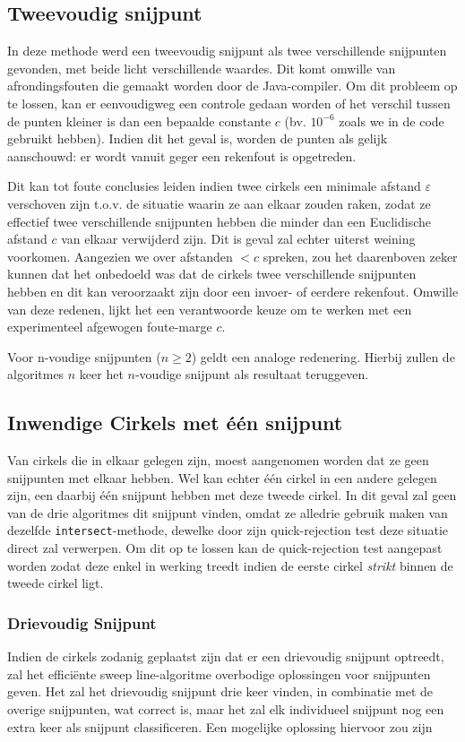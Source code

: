 \documentclass[12pt]{article}
\begin{document}
\subsection{Tweevoudig snijpunt}
In deze methode werd een tweevoudig snijpunt als twee verschillende snijpunten gevonden, met beide licht verschillende waardes. Dit komt omwille van afrondingsfouten die gemaakt worden door de Java-compiler. Om dit probleem op te lossen, kan er eenvoudigweg een controle gedaan worden of het verschil tussen de punten kleiner is dan een bepaalde constante $c$ (bv. $10^{-6}$ zoals we in de code gebruikt hebben). Indien dit het geval is, worden de punten als gelijk aanschouwd: er wordt vanuit geger een rekenfout is opgetreden. 

Dit kan tot foute conclusies leiden indien twee cirkels een minimale afstand $\varepsilon$ verschoven zijn t.o.v. de situatie waarin ze aan elkaar zouden raken, zodat ze effectief twee verschillende snijpunten hebben die minder dan een Euclidische afstand $c$ van elkaar verwijderd zijn. Dit is geval zal echter uiterst weining voorkomen. Aangezien we over afstanden $< c$ spreken, zou het daarenboven zeker kunnen dat het onbedoeld was dat de cirkels twee verschillende snijpunten hebben en dit kan veroorzaakt zijn door een invoer- of eerdere rekenfout. Omwille van deze redenen, lijkt het een verantwoorde keuze om te werken met een experimenteel afgewogen foute-marge $c$.

Voor n-voudige snijpunten ($n \geq 2$) geldt een analoge redenering. Hierbij zullen de algoritmes $n$ keer het $n$-voudige snijpunt als resultaat teruggeven.

\subsection{Inwendige Cirkels met één snijpunt}
Van cirkels die in elkaar gelegen zijn, moest aangenomen worden dat ze geen snijpunten met elkaar hebben. Wel kan echter één cirkel in een andere gelegen zijn, een daarbij één snijpunt hebben met deze tweede cirkel. In dit geval zal geen van de drie algoritmes dit snijpunt vinden, omdat ze alledrie gebruik maken van dezelfde \texttt{intersect}-methode, dewelke door zijn quick-rejection test deze situatie direct zal verwerpen. Om dit op te lossen kan de quick-rejection test aangepast worden zodat deze enkel in werking treedt indien de eerste cirkel \textit{strikt} binnen de tweede cirkel ligt.

\subsubsection{Drievoudig Snijpunt}
Indien de cirkels zodanig geplaatst zijn dat er een drievoudig snijpunt optreedt, zal het efficiënte sweep line-algoritme overbodige oplossingen voor snijpunten geven. Het zal het drievoudig snijpunt drie keer vinden, in combinatie met de overige snijpunten, wat correct is, maar het zal elk individueel snijpunt nog een extra keer als snijpunt classificeren. Een mogelijke oplossing hiervoor zou zijn %
\end{document}
